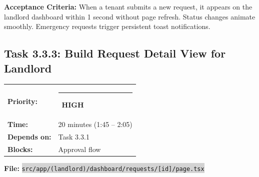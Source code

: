 \documentclass[11pt, a4paper]{article}
\newcommand{\highpri}{\textcolor{highamber}{\rule{6pt}{6pt}}~\textcolor{highamber}{\scriptsize\textbf{HIGH}}}
\newcommand{\code}[1]{\texttt{\small\colorbox{lightgray}{#1}}}
\begin{document}
\textbf{Acceptance Criteria:} When a tenant submits a new request, it appears on the landlord dashboard within 1 second without page refresh. Status changes animate smoothly. Emergency requests trigger persistent toast notifications.

\vspace{1em}

\subsection{Task 3.3.3: Build Request Detail View for Landlord}

\begin{tabularx}{\textwidth}{lX}
\textbf{Priority:} & \highpri \\
\textbf{Time:} & 20 minutes (1:45 -- 2:05) \\
\textbf{Depends on:} & Task 3.3.1 \\
\textbf{Blocks:} & Approval flow \\
\end{tabularx}

\vspace{0.3em}

\textbf{File:} \code{src/app/(landlord)/dashboard/requests/[id]/page.tsx}
\end{document}
